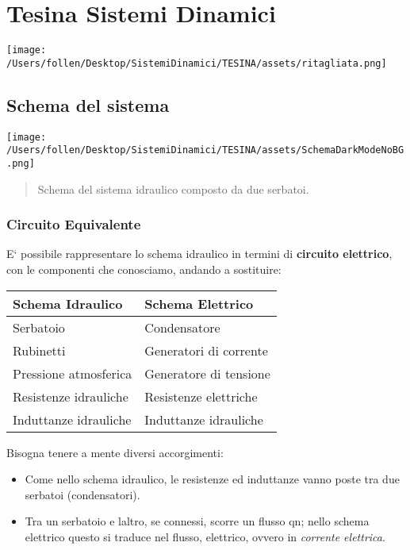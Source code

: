 \documentclass[
]{article}
\author{}
\date{}
\begin{document}
\hypertarget{tesina-sistemi-dinamici}{%
\section{Tesina Sistemi Dinamici}\label{tesina-sistemi-dinamici}}

\texttt{[image: /Users/follen/Desktop/SistemiDinamici/TESINA/assets/ritagliata.png]}

\tableofcontents

\hypertarget{schema-del-sistema}{%
\subsection{Schema del sistema}\label{schema-del-sistema}}

\texttt{[image: /Users/follen/Desktop/SistemiDinamici/TESINA/assets/SchemaDarkModeNoBG.png]}

\begin{quote}
Schema del sistema idraulico composto da due serbatoi.
\end{quote}

\hypertarget{circuito-equivalente}{%
\subsubsection{Circuito Equivalente}\label{circuito-equivalente}}

E` possibile rappresentare lo schema idraulico in termini di
\textbf{circuito elettrico}, con le componenti che conosciamo, andando a
sostituire:

\begin{longtable}[]{@{}ll@{}}
\toprule\noalign{}
Schema Idraulico & Schema Elettrico \\
\midrule\noalign{}
\endhead
\bottomrule\noalign{}
\endlastfoot
Serbatoio & Condensatore \\
Rubinetti & Generatori di corrente \\
Pressione atmosferica & Generatore di tensione \\
Resistenze idrauliche & Resistenze elettriche \\
Induttanze idrauliche & Induttanze idrauliche \\
\end{longtable}

Bisogna tenere a mente diversi accorgimenti:

\begin{itemize}
\item
  Come nello schema idraulico, le resistenze ed induttanze vanno poste
  tra due serbatoi (condensatori).
\item
  Tra un serbatoio e l\textquotesingle altro, se connessi, scorre un
  flusso qn; nello schema elettrico questo si traduce nel flusso,
  elettrico, ovvero in \emph{corrente elettrica}.
\end{itemize}
\end{document}
